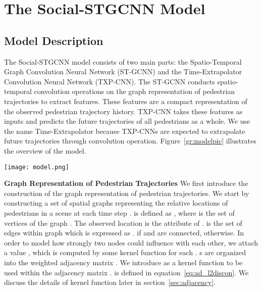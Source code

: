 \documentclass[10pt,twocolumn,letterpaper]{article}
\newcommand*{\ours}{Social-STGCNN }
\begin{document}
\section{The \ours Model}

\label{sec:model}
\subsection{Model Description}
The \ours model consists of two main parts: the Spatio-Temporal Graph Convolution Neural Network (ST-GCNN) and the Time-Extrapolator Convolution Neural Network (TXP-CNN). The ST-GCNN conducts spatio-temporal convolution operations on the graph representation of pedestrian trajectories to extract features. These features are a compact representation of the observed pedestrian trajectory history. TXP-CNN takes these features as inputs and predicts the future trajectories of all pedestrians as a whole. We use the name Time-Extrapolator because TXP-CNNs are expected to extrapolate future trajectories through convolution operation. Figure~\ref{gr:modelpic} illustrates the overview of the model.

\begin{figure*}[ht]
\begin{center}
\texttt{[image: model.png]}
\end{center}
   \caption{The \ours Model. Given  frames, we construct the spatio-temporal graph representing . Then G is forwarded through the Spatio-Temporal Graph Convolution Neural Networks (ST-GCNNs) creating a spatio-temporal embedding. Following this, the TXP-CNNs predicts future trajectories.  is the dimension of pedestrian position,  is the number of pedestrians,  is the number of time steps and   is the dimensions of the embedding coming from ST-GCNN.}
\label{gr:modelpic}
\end{figure*}

\noindent
\textbf{Graph Representation of Pedestrian Trajectories} We first introduce the construction of the graph representation of pedestrian trajectories. We start by constructing a set of spatial graphs  representing the relative locations of pedestrians in a scene at each time step .  is defined as , where  is the set of vertices of the graph . The observed location  is the attribute of .  is the set of edges within graph  which is expressed as .  if  and  are connected,  otherwise. In order to model how strongly two nodes could influence with each other, we attach a value , which is computed by some kernel function for each . s are organized into the weighted adjacency matrix . We introduce  as a kernel function to be used within the adjacency matrix .  is defined in equation~\ref{eq:ad_l2discon}. We discuss the details of  kernel function later in section~\ref{sec:adjacency}.
\end{document}
